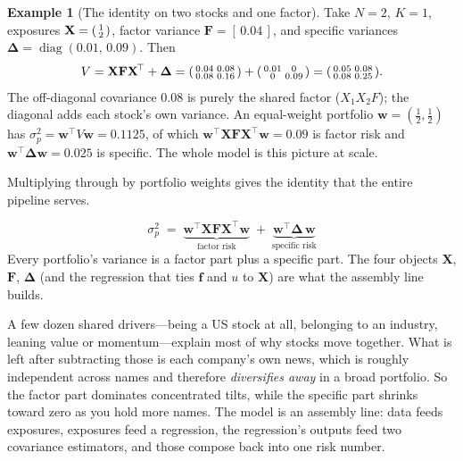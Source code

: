 \documentclass[11pt]{article}
\theoremstyle{definition}
\newtheorem{example}{Example}[section]
\theoremstyle{plain}
\theoremstyle{remark}
\DeclareMathOperator{\diag}{diag}
\newcommand{\T}{^{\!\top}}
\newcommand{\half}{\tfrac12}
\newcommand{\wvec}{\mathbf{w}}
\newcommand{\Xmat}{\mathbf{X}}
\newcommand{\Fmat}{\mathbf{F}}
\newcommand{\Del}{\boldsymbol{\Delta}}
\newcommand{\fvec}{\mathbf{f}}
\begin{document}
\begin{example}[The identity on two stocks and one factor]
Take $N=2$, $K=1$, exposures $\Xmat=\begin{psmallmatrix}1\\2\end{psmallmatrix}$, factor variance $\Fmat=[\,0.04\,]$, and specific variances $\Del=\diag(0.01,\,0.09)$. Then
\[
  V=\Xmat\Fmat\Xmat\T+\Del=\begin{psmallmatrix}0.04 & 0.08\\ 0.08 & 0.16\end{psmallmatrix}+\begin{psmallmatrix}0.01 & 0\\ 0 & 0.09\end{psmallmatrix}=\begin{psmallmatrix}0.05 & 0.08\\ 0.08 & 0.25\end{psmallmatrix}.
\]
The off-diagonal covariance $0.08$ is purely the shared factor ($X_1 X_2 F$); the diagonal adds each stock's own variance. An equal-weight portfolio $\wvec=(\half,\half)$ has $\sigma_p^2=\wvec\T V\wvec = 0.1125$, of which $\wvec\T\Xmat\Fmat\Xmat\T\wvec=0.09$ is factor risk and $\wvec\T\Del\wvec=0.025$ is specific. The whole model is this picture at scale.
\end{example}

Multiplying through by portfolio weights gives the identity that the entire pipeline serves.

\begin{keyresult}
\[
  \boxed{\;\sigma_p^2 \;=\; \underbrace{\wvec\T \Xmat \Fmat \Xmat\T \wvec}_{\text{factor risk}} \;+\; \underbrace{\wvec\T \Del\, \wvec}_{\text{specific risk}}\;}
\]
Every portfolio's variance is a factor part plus a specific part. The four objects $\Xmat$, $\Fmat$, $\Del$ (and the regression that ties $\fvec$ and $u$ to $\Xmat$) are what the assembly line builds.
\end{keyresult}

\begin{intuition}
A few dozen shared drivers---being a US stock at all, belonging to an industry, leaning value or momentum---explain most of why stocks move together. What is left after subtracting those is each company's own news, which is roughly independent across names and therefore \emph{diversifies away} in a broad portfolio. So the factor part dominates concentrated tilts, while the specific part shrinks toward zero as you hold more names. The model is an assembly line: data feeds exposures, exposures feed a regression, the regression's outputs feed two covariance estimators, and those compose back into one risk number.
\end{intuition}
\end{document}
